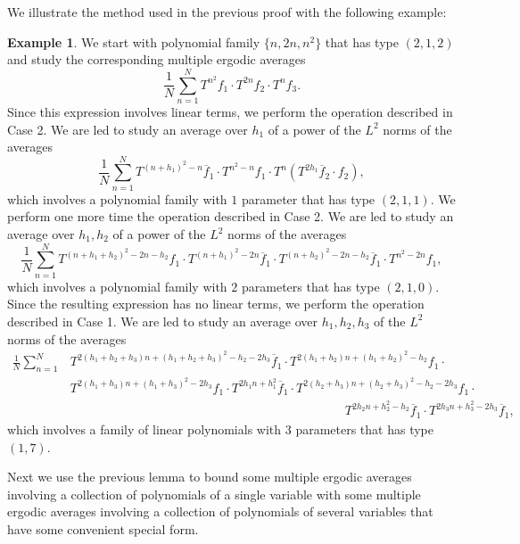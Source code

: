 \documentclass[11pt]{amsart}
\theoremstyle{plain}
\theoremstyle{definition}
\newtheorem{example}{Example}
\theoremstyle{remark}
\begin{document}
We illustrate the method used in the  previous proof with the following example:
\begin{example}\label{Ex:vdc}
We start with polynomial family $\{n,2n,n^2\}$ that has  type $(2,1,2)$  and study the corresponding
multiple ergodic averages
$$
\frac{1}{N}\sum_{n=1}^N T^{n^2}f_1\cdot T^{2n}f_2\cdot T^n f_3.
$$
Since this expression involves linear terms, we  perform the operation described in Case 2.
We are led to study an
 average over $h_1$ of a power of the  $L^2$ norms of the  averages
$$
\frac{1}{N}
\sum_{n=1}^N T^{(n+h_1)^2-n}\overline{f}_1
\cdot T^{n^2-n}f_1\cdot T^{n}(T^{2h_1}\overline{f}_2 \cdot f_2),
$$
which involves a polynomial family with $1$ parameter that has  type $(2,1,1)$.
We perform one more time the operation described in Case 2. We are led to study an
average over $h_1,h_2$ of a power of the $L^2$ norms of the averages
$$
\frac{1}{N}\sum_{n=1}^N T^{(n+h_1+h_2)^2-2n-h_2}f_1
\cdot T^{(n+h_1)^2-2n}\overline{f}_1\cdot T^{(n+h_2)^2-2n-h_2}\overline{f}_1
\cdot T^{n^2-2n}f_1,
$$
which involves a polynomial family with $2$ parameters that has  type $(2,1,0)$.
Since the resulting expression has no linear terms,  we  perform the operation described in Case 1. We are led to study an
average over $h_1,h_2, h_3$ of the $L^2$ norms of the averages
\begin{align*}
\frac{1}{N}\sum_{n=1}^N
&T^{2(h_1+h_2+h_3)n+(h_1+h_2+h_3)^2-h_2-2h_3}\overline{f}_1
\cdot T^{2(h_1+h_2)n+(h_1+h_2)^2-h_2}f_1\cdot \\
& T^{2(h_1+h_3)n +(h_1+h_3)^2-2h_3}f_1\cdot
T^{2h_1n+h_1^2}\overline{f}_1 \cdot
T^{2(h_2+h_3)n+(h_2+h_3)^2-h_2-2h_3}f_1\cdot
  \\
 &\qquad \qquad \qquad \qquad \qquad \qquad \qquad \qquad \qquad \qquad \qquad T^{2h_2n+h_2^2-h_2}\overline{f}_1\cdot
T^{2h_3n+h_3^2-2h_3}\overline{f}_1,
\end{align*}
which involves a family of linear polynomials with $3$ parameters that has type $(1,7)$.
\end{example}
Next we use  the previous lemma to  bound  some multiple ergodic averages involving a
collection of polynomials of a single variable
with some multiple ergodic averages involving a collection of polynomials of several variables
that have some convenient special form.
\end{document}

